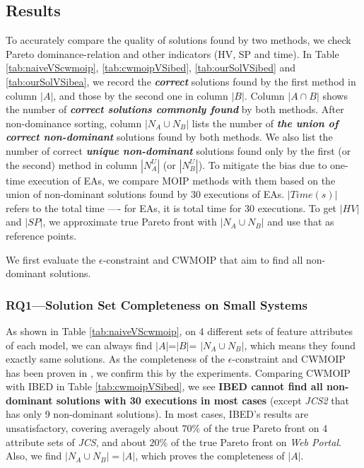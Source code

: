 \subsection{Results}\label{sec:results}
To accurately compare the quality of solutions found by two methods, we check Pareto dominance-relation and other indicators (HV, SP and time).
In Table \ref{tab:naiveVScwmoip}, \ref{tab:cwmoipVSibed}, \ref{tab:ourSolVSibed} and \ref{tab:ourSolVSibea}, we  record the  \emph{\textbf{correct}} solutions  found by the first method in  column \textbf{$|A|$}, and those by the second one in column \textbf{$|B|$}. Column \textbf{$|A  \cap  B|$}  shows  the  number  of  \textbf{\emph{correct  solutions  commonly  found}}  by both methods. After non-dominance sorting, column  $|N_A \cup  N_B|$  lists  the  number of \emph{\textbf{the union of correct non-dominant}} solutions found  by  both  methods.  We also  list  the  number  of correct \emph{\textbf{unique non-dominant}} solutions  found  only by  the first  (or the second) method  in  column  $|N^U_A|$  (or  $|N^U_B|$).
To mitigate the bias due to one-time execution of EAs,  we compare MOIP methods with them based on the union of non-dominant solutions found by 30 executions of EAs.  $|Time(s)|$ refers to the total time ---- for EAs, it is total time for 30 executions. To get $|HV|$ and $|SP|$, we approximate true Pareto front with  $|N_A \cup  N_B|$ and use that as reference points.

We first evaluate the $\epsilon$-constraint and CWMOIP that aim to find all non-dominant solutions.

\subsubsection{RQ1---Solution Set Completeness on Small Systems}\label{sec:results:rq1}
As shown in  Table \ref{tab:naiveVScwmoip}, on 4 different sets of feature attributes of each model, we can always find \textbf{$|A|$}=\textbf{$|B|$}= $|N_A \cup  N_B|$, which means they found exactly same solutions. As the completeness of the $\epsilon$-constraint and CWMOIP has been proven in \cite{e-constraint}\cite{DBLP:journals/eor/OzlenA09}, we confirm this by the experiments.
Comparing CWMOIP with IBED  in  Table \ref{tab:cwmoipVSibed}, we see \textbf{IBED cannot find all non-dominant solutions with 30 executions in most cases} (except \emph{JCS2} that  has only 9 non-dominant solutions). In most cases, IBED's results are unsatisfactory, covering averagely about $70\%$ of the true Pareto front on 4 attribute sets of \emph{JCS}, and about $20\%$ of the true Pareto front on \emph{Web Portal}. Also,  we find $|N_A \cup  N_B|= |A|$, which proves the completeness of $|A|$.
